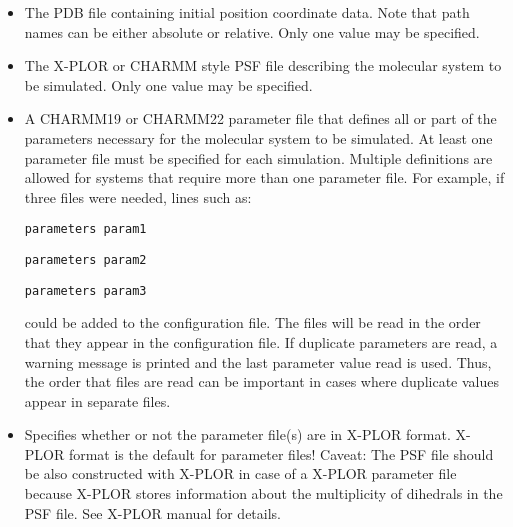 \begin{itemize}
\item
{}
{\label{param:coordinates}
The PDB file containing initial position coordinate data.  
Note that path names can be either absolute or relative.  
Only one value may be specified.}

\item
{}
{\label{param:structure}
The X-PLOR or CHARMM style PSF file describing the molecular 
system to be simulated.  
Only one value may be specified.}

\item
{}
{\label{param:parameters}
A CHARMM19 or CHARMM22 parameter file that defines all or part 
of the parameters necessary for the molecular system to be simulated.  
At least one parameter file must be specified for each simulation.  
Multiple definitions are allowed for systems that require more 
than one parameter file.  For example, if three files were needed, 
lines such as:

\bigskip

\verb!parameters param1!

\verb!parameters param2!

\verb!parameters param3!

\bigskip

\noindent could be added to the configuration file.  
The files will be read 
in the order that they appear in the configuration file.  If duplicate
parameters are read, a warning message is printed and the last
parameter value read is used.  Thus, the order that files are read 
can be important in cases where duplicate values appear in 
separate files.}

\item
{}
{Specifies whether or not the parameter file(s) are in X-PLOR format.
 X-PLOR format is the default for parameter files!
 Caveat: The PSF file should be also constructed with X-PLOR in
 case of a X-PLOR parameter file because X-PLOR stores information
 about the multiplicity of dihedrals in the PSF file. See X-PLOR
 manual for details.}


\end{itemize}
